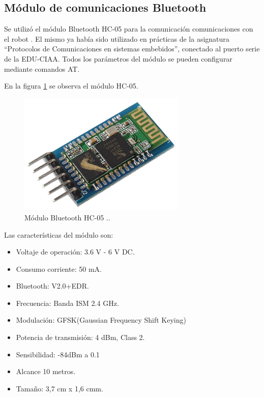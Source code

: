 \subsection{Módulo de comunicaciones Bluetooth}

Se utilizó el módulo Bluetooth HC-05 para la comunicación comunicaciones con el robot \citep{HC05}. El mismo ya había sido utilizado en  prácticas de la asignatura “Protocolos de Comunicaciones en sistemas embebidos”, conectado al puerto serie de la EDU-CIAA. Todos los parámetros del módulo se pueden configurar mediante comandos AT. 

En la figura \ref{fig:moduloHC05} se observa el módulo HC-05.


\begin{figure}[h]
	\centering
	\includegraphics[width=8cm]{./Figures/HC05.jpeg}
	\caption{Módulo Bluetooth HC-05 .\protect\footnotemark.}
	\label{fig:moduloHC05}
\end{figure}



Las características del módulo son:
\begin{itemize}
	\item Voltaje de operación: 3.6 V - 6 V DC.
	\item Consumo corriente: 50 mA.
	\item Bluetooth: V2.0+EDR.
	\item Frecuencia: Banda ISM 2.4 GHz.
	\item Modulación: GFSK(Gaussian Frequency Shift Keying)
	\item Potencia de transmisión: 4 dBm, Class 2.
	\item Sensibilidad: -84dBm a 0.1%
	\item Alcance 10 metros.
	\item Tamaño: 3,7 cm x 1,6 cmm.
\end{itemize}




